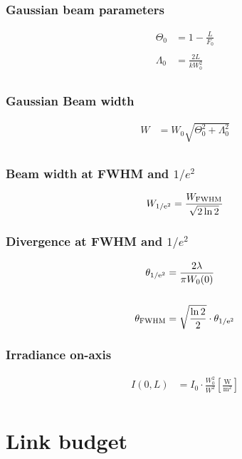 \documentclass[a4paper]{article}
\begin{document}
\subsubsection{Gaussian beam parameters}
\begin{align*}
\Theta_0 &= 1-\frac{L}{F_0} \\
\\
\Lambda_0 &= \frac{2L}{kW_0^2}  \\
\end{align*}

\subsubsection{Gaussian Beam width}
\begin{align*}
W &= W_0\sqrt{\Theta_0^2+\Lambda_0^2} \\
\end{align*}
\subsubsection{Beam width at FWHM and $1/e^2$}
\begin{align*}
W_{\rm{1/e^2}} &= \frac{W_{\rm{FWHM}}}{\sqrt{2\ln 2}} \\
\end{align*}
\subsubsection{Divergence at FWHM and $1/e^2$}
\begin{align*}
\theta_{\rm{1/e^2}} &= \frac{2\lambda}{\pi W_0(0)} \\
\\
\theta_{\rm{FWHM}} &= \sqrt{\frac{\ln 2}{2}}\cdot \theta_{\rm{1/e^2}} \\
\end{align*}

\subsubsection{Irradiance on-axis}
\begin{align*}
I(0,L) &= I_0\cdot \frac{W_0^2}{W^2} \left[ \frac{\textrm{W}}{\textrm{m}^2} \right] \\
\end{align*}
\section{Link budget}
\end{document}
